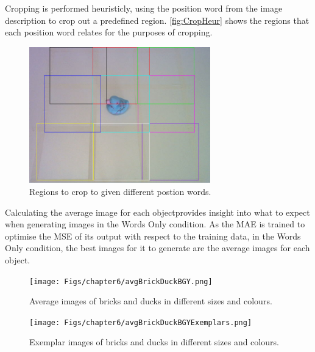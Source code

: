 Cropping is performed heuristicly, using the position word from the image description to crop out a predefined region. \autoref{fig:CropHeur} shows the regions that each position word relates for the purposes of cropping.

\begin{figure}[ht]
    \centering
    \includegraphics[width=0.7\textwidth]{Figs/chapter6/cropHeuristics.png}
    \caption{Regions to crop to given different postion words.}
    \label{fig:CropHeur}
\end{figure}



Calculating the average image for each objectprovides insight into what to expect when generating images in the Words Only condition. As the MAE is trained to optimise the MSE of its output with respect to the training data, in the Words Only condition, the best images for it to generate are the average images for each object.


\begin{figure}[ht]
    \centering
    \texttt{[image: Figs/chapter6/avgBrickDuckBGY.png]}
    \caption{Average images of bricks and ducks in different sizes and colours.}
    \label{fig:AvgBrickDuck}
\end{figure}

\begin{figure}[ht]
    \centering
    \texttt{[image: Figs/chapter6/avgBrickDuckBGYExemplars.png]}
    \caption{Exemplar images of bricks and ducks in different sizes and colours.}
    \label{fig:AvgBrickDuck}
\end{figure}




